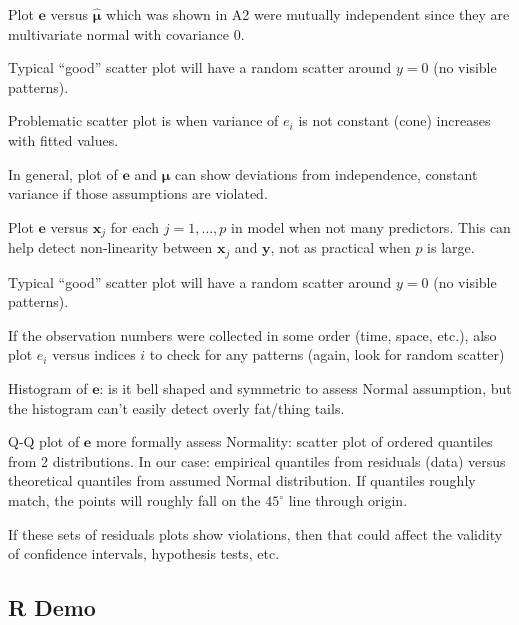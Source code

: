 Plot $ \symbf{e} $ versus $ \hat{\symbf{\mu}} $ which
was shown in A2 were mutually independent
since they are multivariate normal with covariance 0.

Typical ``good'' scatter plot will have a random scatter
around $ y=0 $ (no visible patterns).

Problematic scatter plot is when
variance of $ e_i $ is not constant (cone)
increases with fitted values.

In general, plot of $ \symbf{e} $ and $ \hat{\symbf{\mu}} $
can show deviations from independence, constant variance if those
assumptions are violated.

Plot $ \symbf{e} $ versus $ \symbf{x}_j $ for each $ j=1,\ldots,p $
in model when not many predictors. This can help detect non-linearity
between $ \symbf{x}_j $ and $ \symbf{y} $, not as practical when
$ p $ is large.

Typical ``good'' scatter plot will have a random scatter
around $ y=0 $ (no visible patterns).

If the observation numbers were collected in some order
(time, space, etc.), also plot $ e_i $ versus indices
$ i $ to check for any patterns (again, look for random scatter)

Histogram of $ \symbf{e} $: is it bell shaped and symmetric
to assess Normal assumption, but the histogram can't easily
detect overly fat/thing tails.

Q-Q plot of $ \symbf{e} $ more formally assess Normality:
scatter plot of ordered quantiles from 2 distributions.
In our case: empirical quantiles from residuals (data)
versus theoretical quantiles from assumed Normal distribution.
If quantiles roughly match, the points will roughly fall
on the $ 45^\circ $ line through origin.

If these sets of residuals plots show violations, then that could
affect the validity of confidence intervals, hypothesis tests, etc.

\subsection{R Demo}

